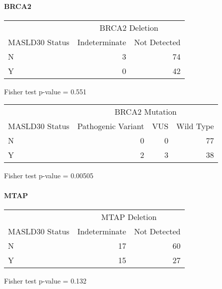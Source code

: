 \documentclass[
]{article}
\begin{document}
\hypertarget{brca2}{%
\paragraph{BRCA2}\label{brca2}}

\begingroup
\fontsize{12.0pt}{14.4pt}\selectfont
\setlength{\LTpost}{0mm}
\begin{longtable}{l|rr}
\toprule
 & \multicolumn{2}{c}{BRCA2 Deletion} \\ 
\cmidrule(lr){2-3}
MASLD30 Status & Indeterminate & Not Detected \\ 
\midrule\addlinespace[2.5pt]
N & 3 & 74 \\ 
Y & 0 & 42 \\ 
\bottomrule
\end{longtable}
\begin{minipage}{\linewidth}
Fisher test p-value =  0.551\\
\end{minipage}
\endgroup

\begingroup
\fontsize{12.0pt}{14.4pt}\selectfont
\setlength{\LTpost}{0mm}
\begin{longtable}{l|rrr}
\toprule
 & \multicolumn{3}{c}{BRCA2 Mutation} \\ 
\cmidrule(lr){2-4}
MASLD30 Status & Pathogenic Variant & VUS & Wild Type \\ 
\midrule\addlinespace[2.5pt]
N & 0 & 0 & 77 \\ 
Y & 2 & 3 & 38 \\ 
\bottomrule
\end{longtable}
\begin{minipage}{\linewidth}
Fisher test p-value =  0.00505\\
\end{minipage}
\endgroup
\pagebreak

\hypertarget{mtap}{%
\paragraph{MTAP}\label{mtap}}

\begingroup
\fontsize{12.0pt}{14.4pt}\selectfont
\setlength{\LTpost}{0mm}
\begin{longtable}{l|rr}
\toprule
 & \multicolumn{2}{c}{MTAP Deletion} \\ 
\cmidrule(lr){2-3}
MASLD30 Status & Indeterminate & Not Detected \\ 
\midrule\addlinespace[2.5pt]
N & 17 & 60 \\ 
Y & 15 & 27 \\ 
\bottomrule
\end{longtable}
\begin{minipage}{\linewidth}
Fisher test p-value =  0.132\\
\end{minipage}
\endgroup
\end{document}
